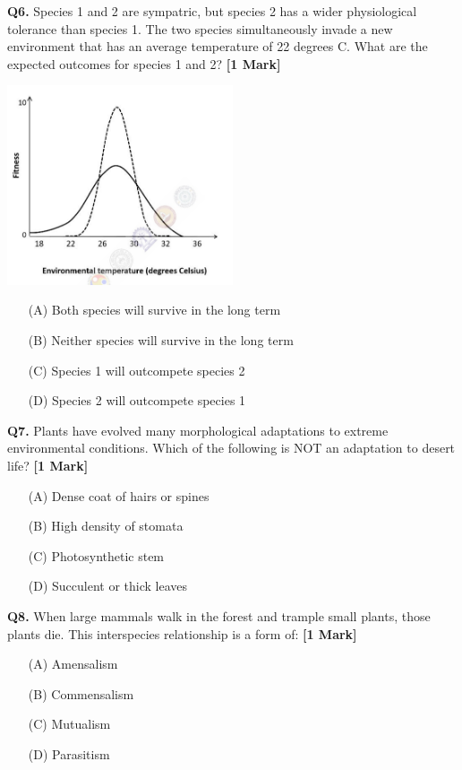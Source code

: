\documentclass[11pt]{article}
\newcommand{\questiona}[2]{
    \noindent\textbf{Q#2.} #1 \hfill \textbf{[1 Mark]}
}
\begin{document}
\questiona{Species 1 and 2 are sympatric, but species 2 has a wider physiological tolerance than species 1. The two species simultaneously invade a new environment that has an average temperature of 22 degrees C. What are the expected outcomes for species 1 and 2?}{6}
\begin{center}
\includegraphics[width=0.5\textwidth]{figures/6.png}
\end{center}
\begin{enumerate}
    \item[(A)] Both species will survive in the long term  
    \item[(B)] Neither species will survive in the long term  
    \item[(C)] Species 1 will outcompete species 2  
    \item[(D)] Species 2 will outcompete species 1  
\end{enumerate}
\vspace{0.5cm}

\questiona{Plants have evolved many morphological adaptations to extreme environmental conditions. Which of the following is NOT an adaptation to desert life?}{7}
\begin{enumerate}
    \item[(A)] Dense coat of hairs or spines  
    \item[(B)] High density of stomata  
    \item[(C)] Photosynthetic stem  
    \item[(D)] Succulent or thick leaves  
\end{enumerate}
\vspace{0.5cm}

\questiona{When large mammals walk in the forest and trample small plants, those plants die. This interspecies relationship is a form of:}{8}
\begin{enumerate}
    \item[(A)] Amensalism  
    \item[(B)] Commensalism  
    \item[(C)] Mutualism  
    \item[(D)] Parasitism  
\end{enumerate}
\vspace{0.5cm}
\end{document}

